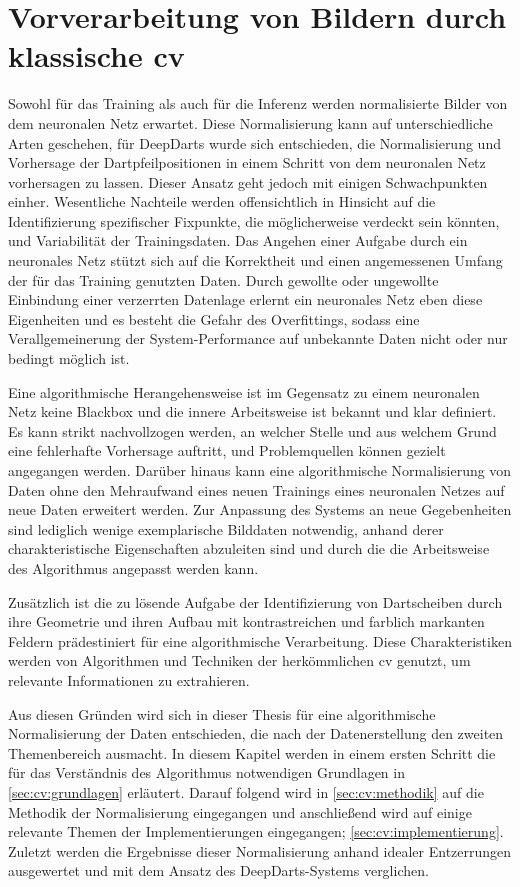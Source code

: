 
\chapter{Vorverarbeitung von Bildern durch klassische \acl{cv}}
\label{cha:cv}

Sowohl für das Training als auch für die Inferenz werden normalisierte Bilder von dem neuronalen Netz erwartet. Diese Normalisierung kann auf unterschiedliche Arten geschehen, für DeepDarts wurde sich entschieden, die Normalisierung und Vorhersage der Dartpfeilpositionen in einem Schritt von dem neuronalen Netz vorhersagen zu lassen. Dieser Ansatz geht jedoch mit einigen Schwachpunkten einher. Wesentliche Nachteile werden offensichtlich in Hinsicht auf die Identifizierung spezifischer Fixpunkte, die möglicherweise verdeckt sein könnten, und Variabilität der Trainingsdaten. Das Angehen einer Aufgabe durch ein neuronales Netz stützt sich auf die Korrektheit und einen angemessenen Umfang der für das Training genutzten Daten. Durch gewollte oder ungewollte Einbindung einer verzerrten Datenlage erlernt ein neuronales Netz eben diese Eigenheiten und es besteht die Gefahr des Overfittings, sodass eine Verallgemeinerung der System-Performance auf unbekannte Daten nicht oder nur bedingt möglich ist.

Eine algorithmische Herangehensweise ist im Gegensatz zu einem neuronalen Netz keine Blackbox und die innere Arbeitsweise ist bekannt und klar definiert. Es kann strikt nachvollzogen werden, an welcher Stelle und aus welchem Grund eine fehlerhafte Vorhersage auftritt, und Problemquellen können gezielt angegangen werden. Darüber hinaus kann eine algorithmische Normalisierung von Daten ohne den Mehraufwand eines neuen Trainings eines neuronalen Netzes auf neue Daten erweitert werden. Zur Anpassung des Systems an neue Gegebenheiten sind lediglich wenige exemplarische Bilddaten notwendig, anhand derer charakteristische Eigenschaften abzuleiten sind und durch die die Arbeitsweise des Algorithmus angepasst werden kann.

Zusätzlich ist die zu lösende Aufgabe der Identifizierung von Dartscheiben durch ihre Geometrie und ihren Aufbau mit kontrastreichen und farblich markanten Feldern prädestiniert für eine algorithmische Verarbeitung. Diese Charakteristiken werden von Algorithmen und Techniken der herkömmlichen \ac{cv} genutzt, um relevante Informationen zu extrahieren.

Aus diesen Gründen wird sich in dieser Thesis für eine algorithmische Normalisierung der Daten entschieden, die nach der Datenerstellung den zweiten Themenbereich ausmacht. In diesem Kapitel werden in einem ersten Schritt die für das Verständnis des Algorithmus notwendigen Grundlagen in \autoref{sec:cv:grundlagen} erläutert. Darauf folgend wird in \autoref{sec:cv:methodik} auf die Methodik der Normalisierung eingegangen und anschließend wird auf einige relevante Themen der Implementierungen eingegangen; \autoref{sec:cv:implementierung}. Zuletzt werden die Ergebnisse dieser Normalisierung anhand idealer Entzerrungen ausgewertet und mit dem Ansatz des DeepDarts-Systems verglichen.





